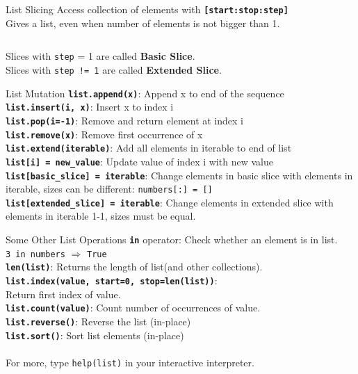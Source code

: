         \begin{frame}{List Slicing}
            \Large
            Access collection of elements with \textbf{\texttt{[start:stop:step]}}\\
            Gives a list, even when number of elements is not bigger than 1.
            \inputminted[frame=single,framesep=2pt,firstline=10]{python3}{../Review1/code-examples/slicing.py}                                
            \LARGE
            Slices with \texttt{step} = 1 are called \textbf{Basic Slice}.\\
            Slices with \texttt{step != 1} are called \textbf{Extended Slice}.
        \end{frame}

        \begin{frame}{List Mutation}
            \Large
            \textbf{\texttt{list.append(x)}}: Append x to end of the sequence\\
            \textbf{\texttt{list.insert(i, x)}}: Insert x to index i\\
            \textbf{\texttt{list.pop(i=-1)}}: Remove and return element at index i\\
            \textbf{\texttt{list.remove(x)}}: Remove first occurrence of x\\
            \textbf{\texttt{list.extend(iterable)}}: Add all elements in iterable to end of list\\
            \textbf{\texttt{list[i] = new\_value}}: Update value of index i with new value\\
            \textbf{\texttt{list[basic\_slice] = iterable}}: Change elements in basic slice with elements in iterable, sizes can be different: \texttt{numbers[:] = []}\\
            \textbf{\texttt{list[extended\_slice] = iterable}}: Change elements in extended slice with elements in iterable 1-1, sizes must be equal.\\
        \end{frame}

        \begin{frame}{Some Other List Operations}
            \Large
            \textbf{\texttt{in}} operator: Check whether an element is in list.\\
            \texttt{3 in numbers} $\Rightarrow$ \texttt{True}\\
            \textbf{\texttt{len(list)}}: Returns the length of list(and other collections).\\
            \textbf{\texttt{list.index(value, start=0, stop=len(list))}}:\\
            Return first index of value.\\
            \textbf{\texttt{list.count(value)}}: Count number of occurrences of value.\\
            \textbf{\texttt{list.reverse()}}: Reverse the list (in-place)\\
            \textbf{\texttt{list.sort()}}: Sort list elements (in-place)\\
            \\ 
            For more, type \texttt{help(list)} in your interactive interpreter.
        \end{frame}

